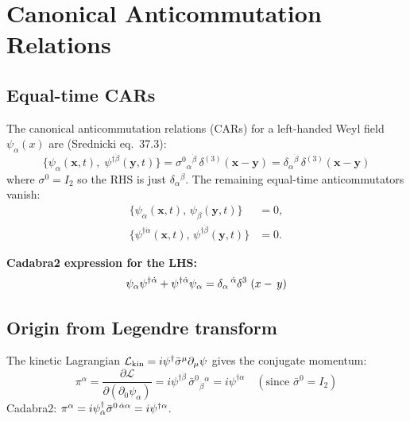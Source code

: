 \section{Canonical Anticommutation Relations}

\subsection{Equal-time CARs}

The canonical anticommutation relations (CARs) for a left-handed Weyl field
$\psi_\alpha(x)$ are (Srednicki eq.~37.3):
\begin{equation}
  \boxed{
    \bigl\{\psi_\alpha(\mathbf{x},t),\;\psi^{\dagger\dot\beta}(\mathbf{y},t)\bigr\}
    = \sigma^0{}_{\alpha}{}^{\dot\beta}\,\delta^{(3)}(\mathbf{x}-\mathbf{y})
    = \delta_\alpha{}^{\dot\beta}\,\delta^{(3)}(\mathbf{x}-\mathbf{y})
  }
  \tag{37.3}
\end{equation}
where $\sigma^0 = I_2$ so the RHS is just $\delta_\alpha{}^{\dot\beta}$.  The remaining
equal-time anticommutators vanish:
\begin{align}
  \bigl\{\psi_\alpha(\mathbf{x},t),\,\psi_\beta(\mathbf{y},t)\bigr\} &= 0,
  \tag{37.4a}\\
  \bigl\{\psi^{\dagger\dot\alpha}(\mathbf{x},t),\,\psi^{\dagger\dot\beta}(\mathbf{y},t)\bigr\} &= 0.
  \tag{37.4b}
\end{align}

\textbf{Cadabra2 expression for the LHS:}
\[
  \psi_{\alpha} \psi^{\dagger \dal}\discretionary{}{}{}+\psi^{\dagger \dal} \psi_{\alpha} = \delta_{\alpha}\,^{\dal} \delta^{3\,}\left(x\discretionary{}{}{}-\,y\right)
\]

\subsection{Origin from Legendre transform}

The kinetic Lagrangian $\mathcal{L}_{\rm kin} = i\psi^\dagger \bar\sigma^\mu\partial_\mu\psi$
gives the conjugate momentum:
\begin{equation}
  \pi^\alpha = \frac{\partial\mathcal{L}}{\partial(\partial_0\psi_\alpha)}
  = i\psi^{\dagger\dot\beta}\,\bar\sigma^{0}{}_{\dot\beta}{}^\alpha
  = i\psi^{\dagger\alpha}
  \quad(\text{since }\bar\sigma^0 = I_2)
\end{equation}
Cadabra2: $\pi^\alpha = i \psi^{\dagger}_{\dot{\alpha}} \bar{\sigma}^{0\, \dot{\alpha} \alpha} = i\psi^{\dagger\alpha}$.

